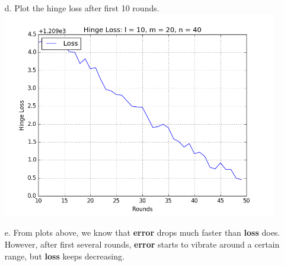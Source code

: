 \begin{enumerate}
\begin{enumerate}
	\item[d.] Plot the hinge loss after first 10 rounds.\\
	\includegraphics[width=12cm]{figure_7}
	\item[e.] From plots above, we know that \textbf{error} drops much faster than \textbf{loss} does. However, after first several rounds, \textbf{error} starts to vibrate around a certain range, but \textbf{loss} keeps decreasing.
	\end{enumerate}
\end{enumerate}



